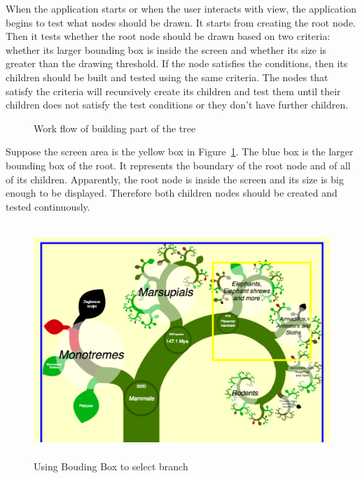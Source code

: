 \documentclass[MSc]{icldt}
\begin{document}
When the application starts or when the user interacts with view, the application begins to test what nodes should be drawn. It starts from creating the root node. Then it tests whether the root node should be drawn based on two criteria: whether its larger bounding box is inside the screen and whether its size is greater than the drawing threshold. If the node satisfies the conditions, then its children should be built and tested using the same criteria. The nodes that satisfy the criteria will recursively create its children and test them until their children does not satisfy the test conditions or they don't have further children. 

\begin{figure} [H]
\caption{Work flow of building part of the tree}
\end{figure}

Suppose the screen area is the yellow box in Figure~\ref{fig:screenAndBounding1}. The blue box is the larger bounding box of the root. It represents the boundary of the root node and of all of its children. Apparently, the root node is inside the screen and its size is big enough to be displayed. Therefore both children nodes should be created and tested continuously.

\begin{figure}[H]
  \centering
  \includegraphics [width=15cm,height=8.8cm]{ScreenAndBounding1}
  \caption{Using Bouding Box to select branch}
  \label{fig:screenAndBounding1}
\end{figure}
\end{document}
